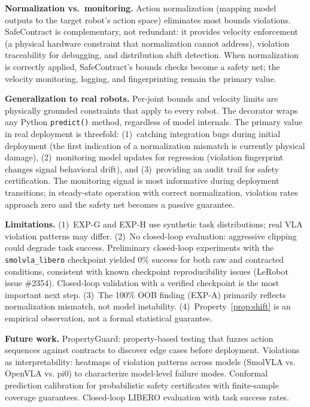 \documentclass[conference]{IEEEtran}
\begin{document}
\textbf{Normalization vs.\ monitoring.}
Action normalization (mapping model outputs to the target robot's action space) eliminates most bounds violations.
SafeContract is complementary, not redundant: it provides velocity enforcement (a physical hardware constraint that normalization cannot address), violation traceability for debugging, and distribution shift detection.
When normalization is correctly applied, SafeContract's bounds checks become a safety net; the velocity monitoring, logging, and fingerprinting remain the primary value.

\textbf{Generalization to real robots.}
Per-joint bounds and velocity limits are physically grounded constraints that apply to every robot.
The decorator wraps any Python \texttt{predict()} method, regardless of model internals.
The primary value in real deployment is threefold:
(1)~catching integration bugs during initial deployment (the first indication of a normalization mismatch is currently physical damage),
(2)~monitoring model updates for regression (violation fingerprint changes signal behavioral drift),
and (3)~providing an audit trail for safety certification.
The monitoring signal is most informative during deployment transitions; in steady-state operation with correct normalization, violation rates approach zero and the safety net becomes a passive guarantee.

\textbf{Limitations.}
(1)~EXP-G and EXP-H use synthetic task distributions; real VLA violation patterns may differ.
(2)~No closed-loop evaluation: aggressive clipping could degrade task success. Preliminary closed-loop experiments with the \texttt{smolvla\_libero} checkpoint yielded 0\% success for both raw and contracted conditions, consistent with known checkpoint reproducibility issues (LeRobot issue \#2354). Closed-loop validation with a verified checkpoint is the most important next step.
(3)~The 100\% OOB finding (EXP-A) primarily reflects normalization mismatch, not model instability.
(4)~Property~\ref{prop:shift} is an empirical observation, not a formal statistical guarantee.

\textbf{Future work.}
PropertyGuard: property-based testing that fuzzes action sequences against contracts to discover edge cases before deployment.
Violations as interpretability: heatmaps of violation patterns across models (SmolVLA vs. OpenVLA vs. pi0) to characterize model-level failure modes.
Conformal prediction calibration for probabilistic safety certificates with finite-sample coverage guarantees.
Closed-loop LIBERO evaluation with task success rates.
\end{document}
